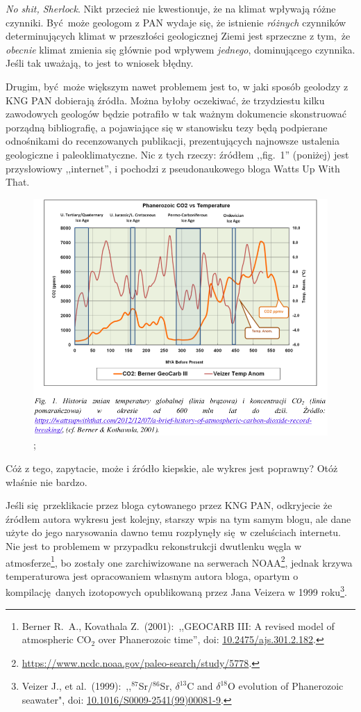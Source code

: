 \documentclass[12pt]{article}
\newcommand{\doi}[1]{doi: \href{htts://doi.org/#1}{#1}}
\begin{document}
\emph{No shit, Sherlock}. Nikt przecież nie kwestionuje, że na klimat wpływają różne czynniki. Być może geologom z PAN wydaje się, że istnienie \emph{różnych} czynników determinujących klimat w przeszłości geologicznej Ziemi jest sprzeczne z tym, że \emph{obecnie} klimat zmienia się głównie pod wpływem \emph{jednego}, dominującego czynnika. Jeśli tak uważają, to jest to wniosek błędny.

Drugim, być może większym nawet problemem jest to, w jaki sposób geolodzy z KNG PAN dobierają źródła. Można byłoby oczekiwać, że trzydziestu kilku zawodowych geologów będzie potrafiło w tak ważnym dokumencie skonstruować porządną bibliografię, a pojawiające się w stanowisku tezy będą podpierane odnośnikami do recenzowanych publikacji, prezentujących najnowsze ustalenia geologiczne i paleoklimatyczne. Nic z tych rzeczy: źródłem ,,fig.~1'' (poniżej) jest przysłowiowy ,,internet'', i pochodzi z pseudonaukowego bloga Watts Up With That.

\begin{figure}
	\centering	
	\includegraphics[width=.95\textwidth]{img/kng1.png};
\end{figure}

Cóż z tego, zapytacie, może i źródło kiepskie, ale wykres jest poprawny? Otóż właśnie nie bardzo.

Jeśli się przeklikacie przez bloga cytowanego przez KNG PAN, odkryjecie że źródłem autora wykresu jest kolejny, starszy wpis na tym samym blogu, ale dane użyte do jego narysowania dawno temu rozpłynęły się w czeluściach internetu. Nie jest to problemem w przypadku rekonstrukcji dwutlenku węgla w atmosferze\footnote{Berner R.~A., Kovathala Z.~(2001):~,,GEOCARB III: A revised model of atmospheric CO$_2$ over Phanerozoic time'', \doi{10.2475/ajs.301.2.182}.}, bo zostały one zarchiwizowane na serwerach NOAA\footnote{\url{https://www.ncdc.noaa.gov/paleo-search/study/5778}.}, jednak krzywa temperaturowa jest opracowaniem własnym autora bloga, opartym o kompilację danych izotopowych opublikowaną przez Jana Veizera w 1999 roku\footnote{Veizer J., et al.~(1999):~,,$^{87}$Sr/$^{86}$Sr, $\delta^{13}$C and $\delta^{18}$O evolution of Phanerozoic seawater", \doi{10.1016/S0009-2541(99)00081-9}.}.
\end{document}
